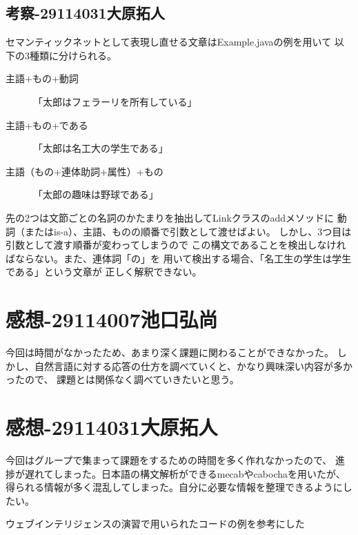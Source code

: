 \documentclass{jarticle}
\begin{document}
\subsection{考察-29114031大原拓人}
セマンティックネットとして表現し直せる文章はExample.javaの例を用いて
以下の3種類に分けられる。
\begin{description}
    \item[主語+もの+動詞] 「太郎はフェラーリを所有している」
    \item[主語+もの+である] 「太郎は名工大の学生である」
    \item[主語（もの+連体助詞+属性）+もの] 「太郎の趣味は野球である」  
\end{description}
先の2つは文節ごとの名詞のかたまりを抽出してLinkクラスのaddメソッドに
動詞（またはis-a）、主語、ものの順番で引数として渡せばよい。
しかし、3つ目は引数として渡す順番が変わってしまうので
この構文であることを検出しなければならない。また、連体詞「の」を
用いて検出する場合、「名工生の学生は学生である」という文章が
正しく解釈できない。

\section{感想-29114007池口弘尚}
今回は時間がなかったため、あまり深く課題に関わることができなかった。
しかし、自然言語に対する応答の仕方を調べていくと、かなり興味深い内容が多かったので、
課題とは関係なく調べていきたいと思う。
\section{感想-29114031大原拓人}
今回はグループで集まって課題をするための時間を多く作れなかったので、
進捗が遅れてしまった。日本語の構文解析ができるmecabやcabochaを用いたが、
得られる情報が多く混乱してしまった。自分に必要な情報を整理できるようにしたい。
\begin{thebibliography}{99}
	 ウェブインテリジェンスの演習で用いられたコードの例を参考にした
\end{thebibliography}
\end{document}
